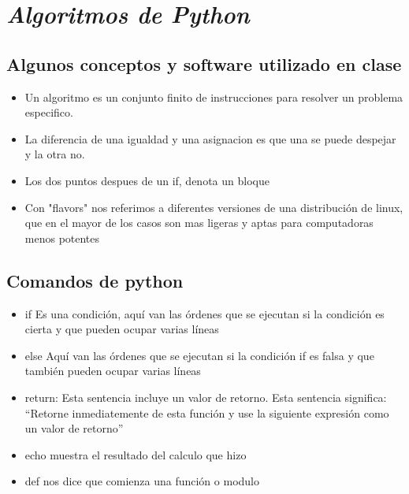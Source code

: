 \documentclass{book}
\begin{document}




\section{\textit{Algoritmos de Python}}%
\begin{flushright}
	\date{14 de enero de 2019}
\end{flushright}

	\subsection {Algunos conceptos y software utilizado en clase}%
	\begin{itemize}
		\item Un algoritmo es un conjunto finito de instrucciones para resolver un problema especifico.
		\item La diferencia de una igualdad y una asignacion es que una se puede despejar y la otra no.			
		\item Los dos puntos despues de un if, denota un bloque
		\item Con "flavors" nos referimos a diferentes versiones de una distribución de linux, que en el mayor de los casos son mas ligeras y aptas para computadoras menos potentes
		
	\end{itemize}
	
	\subsection {Comandos de python}%
	\begin{itemize}%
		\item if Es una condición, aquí van las órdenes que se ejecutan si la condición es cierta
		y que pueden ocupar varias líneas
		\item else Aquí van las órdenes que se ejecutan si la condición if es falsa y que también pueden ocupar varias líneas
		\item return: Esta sentencia incluye un valor de retorno. Esta sentencia significa: “Retorne inmediatemente de esta función y use la siguiente expresión como un valor de retorno”
		\item echo muestra el resultado del calculo que hizo
		\item def nos dice que comienza una función o modulo
		
		
		
	\end{itemize}%
\end{document}
